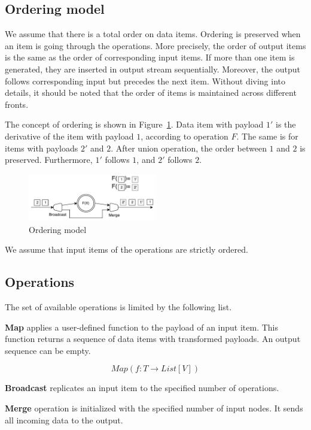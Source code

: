 \subsection{Ordering model}

We assume that there is a total order on data items. Ordering is preserved when an item is going through the operations. More precisely, the order of output items is the same as the order of corresponding input items. If more than one item is generated, they are inserted in output stream sequentially. Moreover, the output follows corresponding input but precedes the next item. Without diving into details, it should be noted that the order of items is maintained across different fronts.

The concept of ordering is shown in Figure~\ref{ordering}. Data item with payload $1'$ is the derivative of the item with payload $1$, according to operation $F$. The same is for items with payloads $2'$ and $2$. After union operation, the order between $1$ and $2$ is preserved. Furthermore, $1'$ follows $1$, and $2'$ follows $2$.  

\begin{figure}[htbp]
  \centering
  \includegraphics[width=0.5\textwidth]{pics/ordering}
  \caption{Ordering model}
  \label {ordering}
\end{figure}

We assume that input items of the operations are strictly ordered.

\subsection{Operations}

The set of available operations is limited by the following list.

{\bf Map} applies a user-defined function to the payload of an input item. This function returns a sequence of data items with transformed payloads. An output sequence can be empty.

\[Map(f: T \rightarrow List[V])\]

{\bf Broadcast} replicates an input item to the specified number of operations.

{\bf Merge} operation is initialized with the specified number of input nodes. It sends all incoming data to the output.

